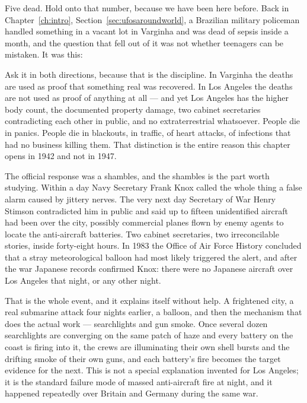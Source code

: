 Five dead. Hold onto that number, because we have been here before. Back in
Chapter~\ref{ch:intro}, Section~\ref{sec:ufosaroundworld}, a Brazilian military policeman handled
something in a vacant lot in Varginha and was dead of sepsis inside a month, and the question that
fell out of it was not whether teenagers can be mistaken. It was this:


Ask it in both directions, because that is the discipline. In Varginha the deaths are used as
proof that something real was recovered. In Los Angeles the deaths are not used as proof of
anything at all --- and yet Los Angeles has the higher body count, the documented property
damage, two cabinet secretaries contradicting each other in public, and no extraterrestrial
whatsoever. People die in panics. People die in blackouts, in traffic, of heart attacks, of
infections that had no business killing them.  That distinction is the entire reason this chapter opens in 1942
and not in 1947.

The official response was a shambles, and the shambles is the part worth studying. Within a day
Navy Secretary Frank Knox called the whole thing a false alarm caused by jittery nerves. The very
next day Secretary of War Henry Stimson contradicted him in public and said up to fifteen
unidentified aircraft had been over the city, possibly commercial planes flown by enemy agents to
locate the anti-aircraft batteries. Two cabinet secretaries, two irreconcilable stories, inside
forty-eight hours. In 1983 the Office of Air Force History concluded that a stray meteorological
balloon had most likely triggered the alert, and after the war Japanese records confirmed Knox:
there were no Japanese aircraft over Los Angeles that night, or any other night.

That is the whole event, and it explains itself without help. A frightened city, a real submarine
attack four nights earlier, a balloon, and then the mechanism that does the actual work ---
searchlights and gun smoke. Once several dozen searchlights are converging on the same patch of
haze and every battery on the coast is firing into it, the crews are illuminating their own shell
bursts and the drifting smoke of their own guns, and each battery's fire becomes the target
evidence for the next.  This is not a special explanation invented for Los Angeles;
it is the standard failure mode of massed anti-aircraft fire at night, and it happened repeatedly
over Britain and Germany during the same war.

